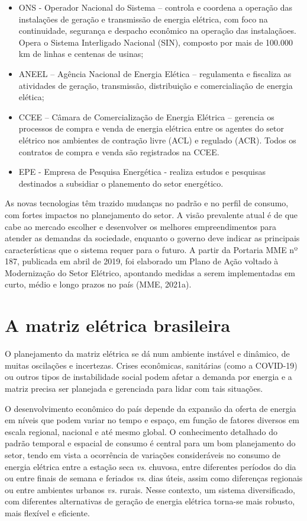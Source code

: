\documentclass[
  oneside]{scrbook}
\providecommand{\tightlist}{%
  \setlength{\itemsep}{0pt}\setlength{\parskip}{0pt}}
\begin{document}
\begin{itemize}
\tightlist
\item
  ONS - Operador Nacional do Sistema -- controla e coordena a operação das instalações de geração e transmissão de energia elétrica, com foco na continuidade, segurança e despacho econômico na operação das instalaçãoes. Opera o Sistema Interligado Nacional (SIN), composto por mais de 100.000 km de linhas e centenas de usinas;
\item
  ANEEL -- Agência Nacional de Energia Elética -- regulamenta e fiscaliza as atividades de geração, transmissão, distribuição e comercialiação de energia elética;
\item
  CCEE -- Câmara de Comercialização de Energia Elétrica -- gerencia os processos de compra e venda de energia elétrica entre os agentes do setor elétrico nos ambientes de contração livre (ACL) e regulado (ACR). Todos os contratos de compra e venda são registrados na CCEE.
\item
  EPE - Empresa de Pesquisa Energética - realiza estudos e pesquisas destinados a subsidiar o planemento do setor energético.
\end{itemize}

As novas tecnologias têm trazido mudanças no padrão e no perfil de consumo, com fortes impactos no planejamento do setor. A visão prevalente atual é de que cabe ao mercado escolher e desenvolver os melhores empreendimentos para atender as demandas da sociedade, enquanto o governo deve indicar as principais características que o sistema requer para o futuro. A partir da Portaria MME nº 187, publicada em abril de 2019, foi elaborado um Plano de Ação voltado à Modernização do Setor Elétrico, apontando medidas a serem implementadas em curto, médio e longo prazos no país (MME, 2021a).

\hypertarget{a-matriz-eluxe9trica-brasileira}{%
\section{A matriz elétrica brasileira}\label{a-matriz-eluxe9trica-brasileira}}

O planejamento da matriz elétrica se dá num ambiente instável e dinâmico, de muitas oscilações e incertezas. Crises econômicas, sanitárias (como a COVID-19) ou outros tipos de instabilidade social podem afetar a demanda por energia e a matriz precisa ser planejada e gerenciada para lidar com tais situações.

O desenvolvimento econômico do país depende da expansão da oferta de energia em níveis que podem variar no tempo e espaço, em função de fatores diversos em escala regional, nacional e até mesmo global. O conhecimento detalhado do padrão temporal e espacial de consumo é central para um bom planejamento do setor, tendo em vista a ocorrência de variações consideráveis no consumo de energia elétrica entre a estação seca \emph{vs}. chuvosa, entre diferentes períodos do dia ou entre finais de semana e feriados \emph{vs}. dias úteis, assim como diferenças regionais ou entre ambientes urbanos \emph{vs.} rurais. Nesse contexto, um sistema diversificado, com diferentes alternativas de geração de energia elétrica torna-se mais robusto, mais flexível e eficiente.
\end{document}

